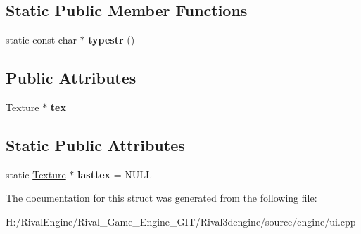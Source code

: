 \subsection*{Static Public Member Functions}
\begin{DoxyCompactItemize}
\item 
\mbox{\label{struct_u_i_1_1_image_a240aed9882a37401a46fdf0df199a535}} 
static const char $\ast$ {\bfseries typestr} ()
\end{DoxyCompactItemize}
\subsection*{Public Attributes}
\begin{DoxyCompactItemize}
\item 
\mbox{\label{struct_u_i_1_1_image_a352cde819c1b0cfcbf497bcd1326c831}} 
\hyperlink{struct_texture}{Texture} $\ast$ {\bfseries tex}
\end{DoxyCompactItemize}
\subsection*{Static Public Attributes}
\begin{DoxyCompactItemize}
\item 
\mbox{\label{struct_u_i_1_1_image_a52c1028ad9d01f75104a4bb3d6984fb7}} 
static \hyperlink{struct_texture}{Texture} $\ast$ {\bfseries lasttex} = N\+U\+LL
\end{DoxyCompactItemize}


The documentation for this struct was generated from the following file\+:\begin{DoxyCompactItemize}
\item 
H\+:/\+Rival\+Engine/\+Rival\+\_\+\+Game\+\_\+\+Engine\+\_\+\+G\+I\+T/\+Rival3dengine/source/engine/ui.\+cpp\end{DoxyCompactItemize}
